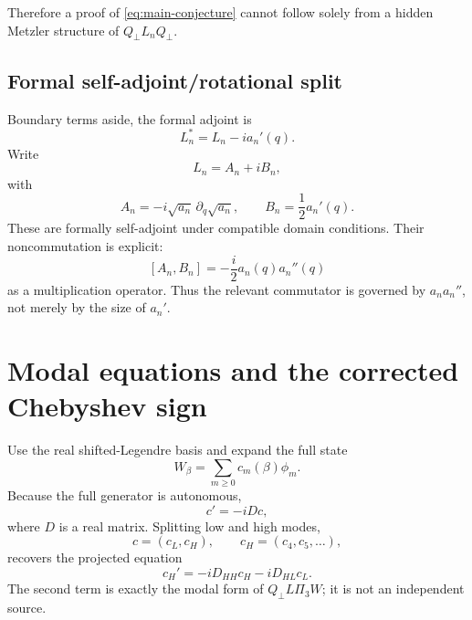 \documentclass[11pt]{amsart}
\numberwithin{equation}{section}
\theoremstyle{plain}
\theoremstyle{definition}
\theoremstyle{remark}
\begin{document}
Therefore a proof of \eqref{eq:main-conjecture} cannot follow solely from a hidden Metzler structure of $Q_\perp L_nQ_\perp$.

\subsection{Formal self-adjoint/rotational split}

Boundary terms aside, the formal adjoint is
\begin{equation}
L_n^*=L_n-ia_n'(q).
\end{equation}
Write
\begin{equation}
L_n=A_n+iB_n,
\end{equation}
with
\begin{equation}
\boxed{
A_n=-i\sqrt{a_n}\,\partial_q\sqrt{a_n},
\qquad
B_n=\frac12a_n'(q).
}
\label{eq:AB}
\end{equation}
These are formally self-adjoint under compatible domain conditions.  Their noncommutation is explicit:
\begin{equation}
\boxed{
[A_n,B_n]=-\frac{i}{2}a_n(q)a_n''(q)
}
\label{eq:commutator}
\end{equation}
as a multiplication operator.  Thus the relevant commutator is governed by $a_na_n''$, not merely by the size of $a_n'$.

\section{Modal equations and the corrected Chebyshev sign}
\label{sec:modal}

Use the real shifted-Legendre basis and expand the full state
\begin{equation}
W_\beta=\sum_{m\ge0}c_m(\beta)\phi_m.
\end{equation}
Because the full generator is autonomous,
\begin{equation}
\boxed{c'=-iDc,}
\label{eq:c-full}
\end{equation}
where $D$ is a real matrix.  Splitting low and high modes,
\begin{equation}
c=(c_L,c_H),
\qquad
c_H=(c_4,c_5,\ldots),
\end{equation}
recovers the projected equation
\begin{equation}
c_H'=-iD_{HH}c_H-iD_{HL}c_L.
\label{eq:high-forced}
\end{equation}
The second term is exactly the modal form of $Q_\perp L\Pi_3W$; it is not an independent source.
\end{document}
